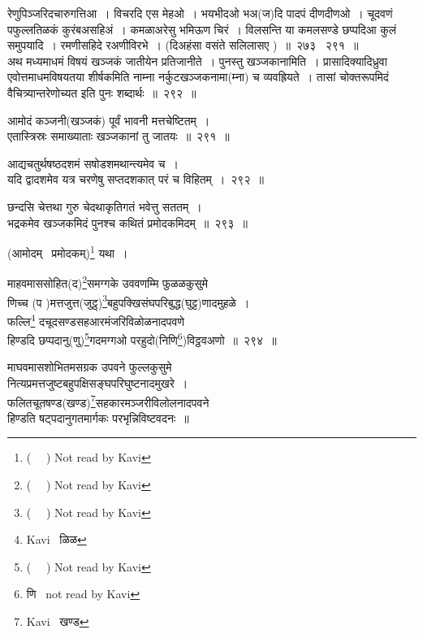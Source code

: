 \documentclass[11pt, openany]{book}
\begin{document}
\noindent
रेणुपिञ्जरिदचारुगत्तिआ~। विचरदि एस मेहओ~। भयभीदओ भअ(ज)दि पादपं दीणदीणओ~। चूदवणं पफुल्लतिळकं कुरंबअसहिअं~। कमळाअरेसु भमिऊण चिरं~। विलसन्ति या कमलसण्डे छप्पदिआ कुलं समुपयादि~। रमणीसहिदे रअणीविरभे~। (दिअहंसा वसंते सलिलासए )~॥~२७३ \textendash\ २९१~॥\\


अथ मध्यमाधमं विषयं खञ्जकं जातीयेन प्रतिजानीते~। {\qtt पुनस्तु खञ्जकानामिति}~। प्रासादिक्यादिध्रुवा एवोत्तमाधमविषयतया शीर्षकमिति नाम्ना नर्कुटखञ्जकनामा(म्ना) च व्यवह्रियते~। तासां चोक्तरूपमिदं वैचित्र्यान्तरेणोच्यत इति {\qtt पुनः} शब्दार्थः~॥~२९२~॥

\newpage

\begin{quote}

\end{quote}
{\na आमोदं कञ्जनी(खञ्जकं) पूर्वं भावनी मत्तचेष्टितम्~। \\
एतास्त्रिस्रः समाख्याताः खञ्जकानां तु जातयः~॥~२९१~॥ 

आद्यचतुर्थषष्ठदशमं सषोडशमथान्त्यमेव च~।\\
यदि द्वादशमेव यत्र चरणेषु सप्तदशकात् परं च विहितम्~।~२९२~॥ 

छन्दसि चेत्तथा गुरु चेदथाकृतिगतं भवेत्तु सततम्~।\\
भद्रकमेव खञ्जकमिदं पुनश्च कथितं प्रमोदकमिदम्~॥~२९३~॥}

(आमोदम् \textendash\ प्रमोदकम्)\renewcommand{\thefootnote}{1}\footnote{( \textendash\ \textendash\ \textendash ) Not read by Kavi} यथा~। 

{\na माहवमाससोहित(द)\renewcommand{\thefootnote}{2}\footnote{( \textendash\ \textendash\ \textendash ) Not read by Kavi}समग्गके उववणम्मि फुळळकुसुमे\\
णिच्च (प )मत्तजुत्त(जुट्ठ्)\renewcommand{\thefootnote}{3}\footnote{( \textendash\ \textendash\ \textendash ) Not read by Kavi}बहुपक्खिसंघपरिबुद्ध(घुट्ट)णादमुहळे~। \\
फल्लि\renewcommand{\thefootnote}{4}\footnote{Kavi \textendash\ ळिळ} दचूदसण्डसहआरमंजरिविळोळनादपवणे\\
हिण्डदि छप्पदानु(णु)\renewcommand{\thefootnote}{5}\footnote{( \textendash\ \textendash\ \textendash ) Not read by Kavi}गदमग्गओ परहुदो(निणि\renewcommand{\thefootnote}{6}\footnote{णि \textendash\ not read by Kavi})विट्ठवअणो~॥~२९४~॥}

{\qt माघवमासशोभितमसग्रक उपवने फुल्लकुसुमे \\
 नित्यप्रमत्तजुष्टबहुपक्षिसङ्घपरिघुष्टनादमुखरे~। \\
फलितचूतषण्ड(खण्ड)\renewcommand{\thefootnote}{7}\footnote{Kavi \textendash\ खण्ड}सहकारमञ्जरीविलोलनादपवने\\
 हिण्डति षट्पदानुगतमार्गकः परभृन्निविष्टवदनः~॥}
\end{document}
